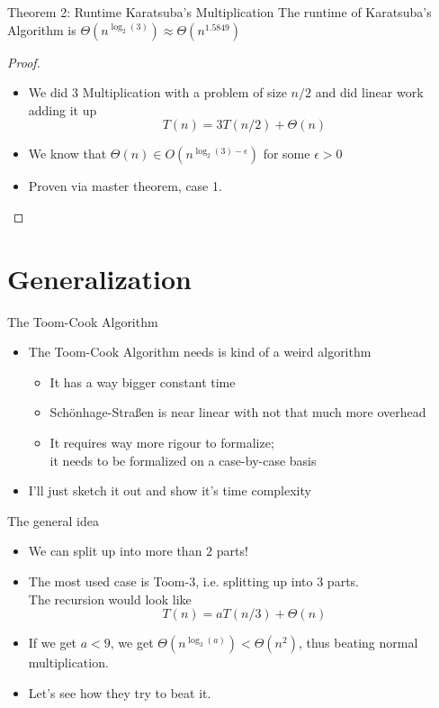 \documentclass[12pt]{beamer}
\begin{document}
\begin{frame}{}
\begin{block}{Theorem 2: Runtime Karatsuba's Multiplication}
The runtime of Karatsuba's Algorithm is $\Theta(n^{\log_2(3)}) \approx \Theta(n^{1.5849})$
\end{block}
\pause
\begin{proof}
\begin{itemize}
\item We did 3 Multiplication with a problem of size $n/2$ and did linear work adding it up
\[
T(n) = 3T(n/2) + \Theta(n)
\]
\pause
\item We know that $\Theta(n) \in O(n^{\log_2(3) - \epsilon})$ for some $\epsilon > 0$
\pause
\item Proven via master theorem, case 1.
\end{itemize}
\end{proof}
\end{frame}{}

\section{Generalization}

\begin{frame}{The Toom-Cook Algorithm}
\begin{itemize}
\item The Toom-Cook Algorithm needs is kind of a weird algorithm
\pause
\begin{itemize}
\item It has a way bigger constant time
\pause
\item Sch\"onhage-Stra\ss{}en is near linear with not that much more overhead
\pause
\item It requires way more rigour to formalize;\\
it needs to be formalized on a case-by-case basis
\end{itemize}
\item I'll just sketch it out and show it's time complexity
\end{itemize}
\end{frame}

\begin{frame}{The general idea}
\begin{itemize}
\item We can split up into more than $2$ parts!
\pause
\item The most used case is Toom-3, i.e. splitting up into 3 parts.\\
The recursion would look like
\[
T(n) = aT(n/3) + \Theta(n)
\]
\pause
\item If we get $a<9$, we get $\Theta(n^{\log_3(a)}) < \Theta(n^2)$, thus beating normal multiplication.
\pause
\item Let's see how they try to beat it.
\end{itemize}
\end{frame}
\end{document}
